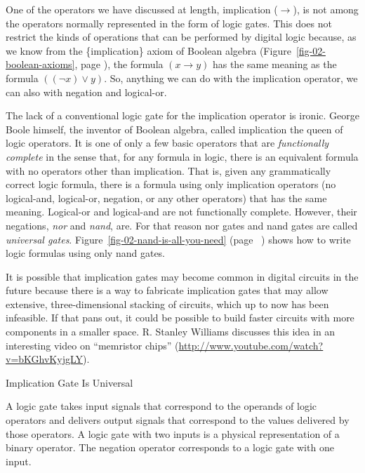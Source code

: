 \begin{aside}
One of the operators we have discussed at length, implication
($\rightarrow$), is not among the operators normally represented
in the form of logic gates. This does not restrict the kinds of
operations that can be performed by digital logic because,
as we know from the \{implication\} axiom of Boolean algebra
(Figure~\ref{fig-02-boolean-axioms}, page \pageref{fig-02-boolean-axioms}),
the formula $(x \rightarrow y)$ has the same meaning as the
formula $((\neg x) \vee y)$. So, anything we can do with
the implication operator, we can also with
negation and logical-or.

The lack of a conventional logic gate for the implication operator
is ironic.
George Boole himself, the inventor of Boolean algebra,
called implication the queen of logic operators.
It is one of only a few basic operators
that are \emph{functionally complete} in the sense that,
for any formula in logic, there is an equivalent formula
with no operators other than implication.
That is, given any grammatically correct logic formula,
there is a formula using only
implication operators (no logical-and, logical-or,
negation, or any other operators)
that has the same meaning.
Logical-or and logical-and are not functionally complete.
However, their negations, \emph{nor} and \emph{nand}, are.
For that reason nor gates and nand gates
are called \emph{universal gates}.
Figure~\ref{fig-02-nand-is-all-you-need} (page ~\pageref{fig-02-nand-is-all-you-need})
shows how to write logic formulas using only nand gates.

It is possible that implication gates may
become common in digital circuits in the future
because there is a way to fabricate implication gates that may allow extensive,
three-dimensional stacking of circuits, which up to now has been infeasible.
If that pans out, it could be possible to build
faster circuits with more components in a smaller space.
R. Stanley Williams discusses this
idea in an interesting video on ``memristor chips''
(\url{http://www.youtube.com/watch?v=bKGhvKyjgLY}).
\caption{Implication Gate Is Universal}
\label{no-implication-gate}
\end{aside}

A logic gate takes input signals that correspond
to the operands of logic operators and delivers output signals
that correspond to the values delivered by those operators.
A logic gate with two inputs is a physical representation of
a binary operator. The negation operator corresponds to a
logic gate with one input.

